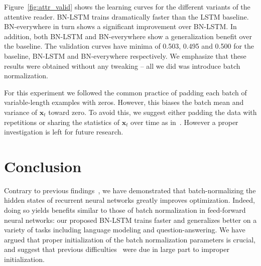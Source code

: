 \documentclass{article} %
\newcommand{\vect}[1]{\mathbf{#1}}
\begin{document}
Figure~\ref{fig:attr_valid} shows the learning curves for the different variants of the attentive reader.
BN-LSTM trains dramatically faster than the LSTM baseline.
BN-everywhere in turn shows a significant improvement over BN-LSTM.
In addition, both BN-LSTM and BN-everywhere show a generalization benefit over the baseline.
The validation curves have minima of 0.503, 0.495 and 0.500 for the baseline, BN-LSTM and BN-everywhere respectively.
We emphasize that these results were obtained without any tweaking -- all we did was introduce batch normalization.

For this experiment we followed the common practice of padding each batch of variable-length examples with zeros.
However, this biases the batch mean and variance of $\vect{x}_t$ toward zero.
To avoid this, we suggest either padding the data with repetitions or sharing the statistics of $\vect{x}_t$ over time as in~\cite{cesar}.
However a proper investigation is left for future research.

\section{Conclusion}

Contrary to previous findings~\cite{cesar,baidu},
we have demonstrated that batch-normalizing the hidden states of recurrent neural networks greatly improves optimization.
Indeed, doing so yields benefits similar to those of batch normalization in feed-forward neural networks:
our proposed BN-LSTM trains faster and generalizes better on a variety of tasks including language modeling and question-answering.
We have argued that proper initialization of the batch normalization parameters is crucial,
and suggest that previous difficulties~\cite{cesar, baidu} were due in large part to improper initialization.





\end{document}
